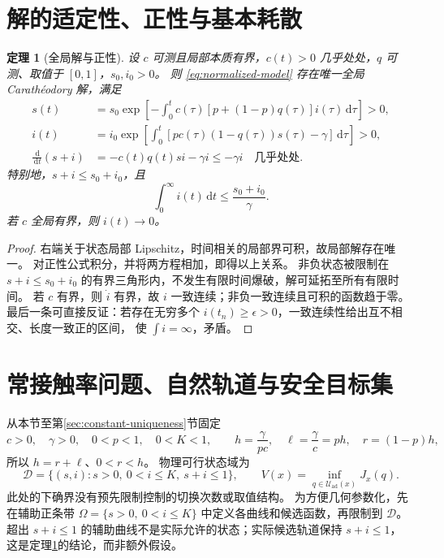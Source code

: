 \documentclass[11pt,a4paper,UTF8]{ctexart}
\newtheorem{theorem}{定理}[section]
\theoremstyle{definition}
\newcommand{\Dcal}{\mathcal D}
\newcommand{\Uad}{\mathcal U_{\mathrm{ad}}}
\newcommand{\dd}{\,\mathrm d}
\begin{document}
\section{解的适定性、正性与基本耗散}
\label{sec:wellposed}
\begin{theorem}[全局解与正性]
\label{thm:wellposed}
设 $c$ 可测且局部本质有界，$c(t)>0$ 几乎处处，$q$ 可测、取值于 $[0,1]$，$s_0,i_0>0$。
则 \eqref{eq:normalized-model} 存在唯一全局 Carath\'eodory 解，满足
\begin{align}
s(t)&=s_0\exp\left[-\int_0^t c(\tau)[p+(1-p)q(\tau)]i(\tau)\dd\tau\right]>0,
\label{eq:s-positive}\\
i(t)&=i_0\exp\left[\int_0^t[pc(\tau)(1-q(\tau))s(\tau)-\gamma]\dd\tau\right]>0,
\label{eq:i-positive}\\
\frac{\dd}{\dd t}(s+i)&=-c(t)q(t)si-\gamma i\le-\gamma i\quad\text{几乎处处}.
\label{eq:sum-decay}
\end{align}
特别地，$s+i\le s_0+i_0$，且
\begin{equation}
\int_0^\infty i(t)\dd t\le\frac{s_0+i_0}{\gamma}.
\label{eq:i-integrable}
\end{equation}
若 $c$ 全局有界，则 $i(t)\to0$。
\end{theorem}
\begin{proof}
右端关于状态局部 Lipschitz，时间相关的局部界可积，故局部解存在唯一。
对正性公式积分，并将两方程相加，即得以上关系。
非负状态被限制在 $s+i\le s_0+i_0$ 的有界三角形内，不发生有限时间爆破，解可延拓至所有有限时间。
若 $c$ 有界，则 $\dot i$ 有界，故 $i$ 一致连续；非负一致连续且可积的函数趋于零。
最后一条可直接反证：若存在无穷多个 $i(t_n)\ge\epsilon>0$，一致连续性给出互不相交、长度一致正的区间，
使 $\int i=\infty$，矛盾。
\end{proof}

\section{常接触率问题、自然轨道与安全目标集}
\label{sec:constant-problem}
从本节至第\ref{sec:constant-uniqueness}节固定
\begin{equation}
c>0,\quad\gamma>0,\quad0<p<1,\quad0<K<1,
\qquad h=\frac{\gamma}{pc},\quad\ell=\frac{\gamma}{c}=ph,\quad r=(1-p)h,
\label{eq:constants}
\end{equation}
所以 $h=r+\ell$、$0<r<h$。
物理可行状态域为
\begin{equation}
\Dcal=\{(s,i):s>0,\ 0<i\le K,\ s+i\le1\},\qquad
V(x)=\inf_{q\in\Uad(x)}J_x(q).
\label{eq:value-definition}
\end{equation}
此处的下确界没有预先限制控制的切换次数或取值结构。
为方便几何参数化，先在辅助正条带
$\Omega=\{s>0,\ 0<i\le K\}$ 中定义各曲线和候选函数，再限制到 $\Dcal$。
超出 $s+i\le1$ 的辅助曲线不是实际允许的状态；实际候选轨道保持 $s+i\le1$，
这是定理\ref{thm:wellposed}的结论，而非额外假设。
\end{document}
